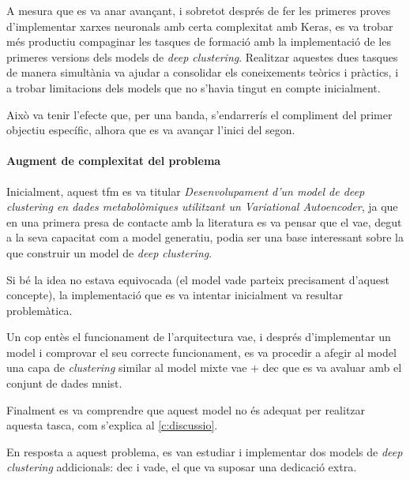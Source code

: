 \documentclass[CAT,BIB]{TFUOC}%
\begin{document}
            A mesura que es va anar avançant,
            i sobretot després de fer les primeres proves
            d'implementar xarxes neuronals amb certa complexitat amb Keras,
            es va trobar més productiu compaginar
            les tasques de formació
            amb la implementació de les primeres versions
            dels models de \textit{deep clustering}.
            Realitzar aquestes dues tasques
            de manera simultània va ajudar a consolidar els coneixements
            teòrics i pràctics,
            i a trobar limitacions dels models que no s'havia tingut en compte inicialment.

            Això va tenir l'efecte que,
            per una banda,
            s'endarrerís el compliment del primer objectiu específic,
            alhora que es va avançar l'inici del segon.

        \paragraph{Augment de complexitat del problema}
            Inicialment,
            aquest \gls{tfm} es va titular
            \textit{Desenvolupament d’un model de \textit{deep clustering}
            en dades metabolòmiques
            utilitzant un Variational Autoencoder},
            ja que en una primera presa de contacte amb la literatura
            es va pensar que el \gls{vae},
            degut a la seva capacitat com a model generatiu,
            podia ser una base interessant
            sobre la que construir un model de \textit{deep clustering}.

            Si bé la idea no estava equivocada
            (el model \gls{vade} parteix precisament d'aquest concepte),
            la implementació que es va intentar inicialment
            va resultar problemàtica.

            Un cop entès el funcionament de l'arquitectura \gls{vae},
            i després d'implementar un model i comprovar el seu correcte funcionament,
            es va procedir a afegir al model una capa de \textit{clustering}
            similar al model mixte \gls{vae} + \gls{dec}
            que es va avaluar amb el conjunt de dades \gls{mnist}.

            Finalment es va comprendre que aquest model
            no és adequat per realitzar aquesta tasca,
            com s'explica al \cref{c:discussio}.

            En resposta a aquest problema,
            es van estudiar i implementar dos models de \textit{deep clustering}
            addicionals: \gls{dec} i \gls{vade},
            el que va suposar una dedicació extra.
\end{document}

